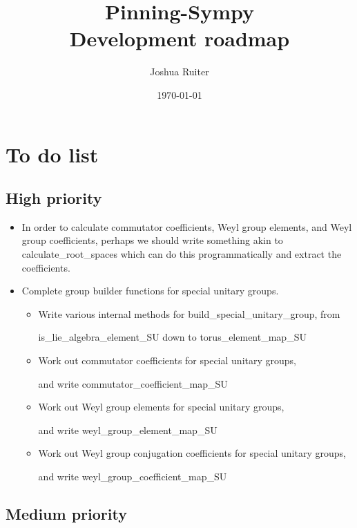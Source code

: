 \documentclass[12pt]{article}
\title{Pinning-Sympy \\
	Development roadmap}
\author{Joshua Ruiter}
\date{\today}
\begin{document}
\maketitle
\tableofcontents

\newpage

\section{To do list}

\subsection{High priority}

\begin{itemize}
	\item In order to calculate commutator coefficients, Weyl group elements, and Weyl group coefficients, perhaps we should write something akin to calculate\_root\_spaces which can do this programmatically and extract the coefficients.

	\item Complete group builder functions for special unitary groups.
	\begin{itemize}
		\item Write various internal methods for build\_special\_unitary\_group, from 

		is\_lie\_algebra\_element\_SU down to torus\_element\_map\_SU

		\item Work out commutator coefficients for special unitary groups, 

and write commutator\_coefficient\_map\_SU

		\item Work out Weyl group elements for special unitary groups, 

and write weyl\_group\_element\_map\_SU

		\item Work out Weyl group conjugation coefficients for special unitary groups, 

and write weyl\_group\_coefficient\_map\_SU
	\end{itemize}
\end{itemize}

\subsection{Medium priority}
\end{document}
